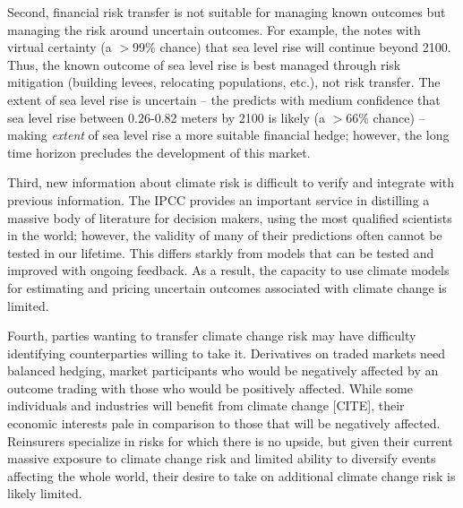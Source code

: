 \documentclass[authoryear]{article}
\begin{document}
Second, financial risk transfer is not suitable for managing known outcomes but managing the risk around uncertain outcomes. %
For example, the \citet{ipcc2013fifthReport} notes with virtual certainty (a $>$99\% chance) that sea level rise will continue beyond 2100. Thus, the known outcome of sea level rise is best managed through risk mitigation (building levees, relocating populations, etc.), not risk transfer. The extent of sea level rise is uncertain -- the \citet{ipcc2013fifthReport} predicts with medium confidence that sea level rise between 0.26-0.82 meters by 2100 is likely (a $>$66\% chance) -- making \textit{extent} of sea level rise a more suitable financial hedge; however, the long time horizon precludes the development of this market.

Third, new information about climate risk is difficult to verify and integrate with previous information. The IPCC provides an important service in distilling a massive body of literature for decision makers, using the most qualified scientists in the world; however, the validity of many of their predictions often cannot be tested in our lifetime. This differs starkly from models that can be tested and improved with ongoing feedback. As a result, the capacity to use climate models for estimating and pricing uncertain outcomes associated with climate change is limited.

Fourth, parties wanting to transfer climate change risk may have difficulty identifying counterparties willing to take it. Derivatives on traded markets need balanced hedging, market participants  who would be negatively affected by an outcome trading with those who would be positively affected. While some individuals and industries will benefit from climate change [CITE], their economic interests pale in comparison to those that will be negatively affected. Reinsurers specialize in risks for which there is no upside, but given their current massive exposure to climate change risk and limited ability to diversify events affecting the whole world, their desire to take on additional climate change risk is likely limited.
\end{document}
